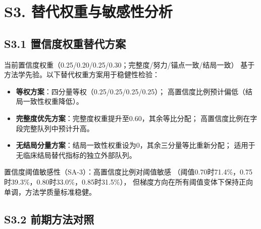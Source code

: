 \documentclass[12pt, a4paper]{ctexart}
\begin{document}
\section*{S3. 替代权重与敏感性分析}

\subsection*{S3.1 置信度权重替代方案}

当前置信度权重（0.25/0.20/0.25/0.30；完整度/努力/锚点一致/结局一致）
基于方法学先验。以下替代权重方案用于稳健性检验：

\begin{itemize}
  \item \textbf{等权方案}：四分量等权（0.25/0.25/0.25/0.25）；
    高置信度比例预计偏低（结局一致性权重降低）。
  \item \textbf{完整度优先方案}：完整度权重提升至0.60，其余等比分配；
    高置信度比例在字段完整队列中预计升高。
  \item \textbf{无结局分量方案}：结局一致性权重设为0，其余三分量等比重新分配；
    适用于无临床结局替代指标的独立外部队列。
\end{itemize}

置信度阈值敏感性（SA-3）：高置信度比例对阈值敏感
（阈值0.70时71.4\%，0.75时39.3\%，0.80时33.0\%，0.85时31.5\%），
但梯度方向在所有阈值变体下保持正向单调，方法学质量标准稳健。

\subsection*{S3.2 前期方法对照}
\end{document}
